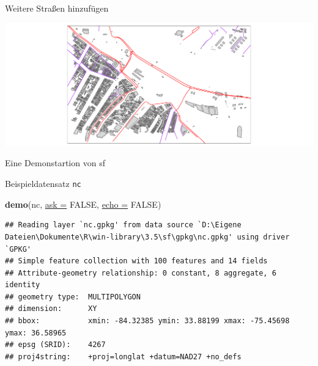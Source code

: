 \documentclass[ignorenonframetext,]{beamer}
\newenvironment{Shaded}{\begin{snugshade}}{\end{snugshade}}
\newcommand{\DataTypeTok}[1]{\textcolor[rgb]{0.74,0.68,0.62}{\underline{#1}}}
\newcommand{\KeywordTok}[1]{\textcolor[rgb]{0.26,0.66,0.93}{\textbf{#1}}}
\newcommand{\NormalTok}[1]{\textcolor[rgb]{0.74,0.68,0.62}{#1}}
\newcommand{\OperatorTok}[1]{\textcolor[rgb]{0.74,0.68,0.62}{#1}}
\newcommand{\OtherTok}[1]{\textcolor[rgb]{0.74,0.68,0.62}{#1}}
\newcommand{\StringTok}[1]{\textcolor[rgb]{0.02,0.61,0.04}{#1}}
\begin{document}
\begin{frame}[fragile]{Weitere Straßen hinzufügen}
\protect\hypertarget{weitere-straen-hinzufugen}{}

\begin{Shaded}
\end{Shaded}

\includegraphics{B7_simplefeatures_files/figure-beamer/unnamed-chunk-36-1.pdf}

\end{frame}

\begin{frame}[fragile]{Eine Demonstartion von sf}
\protect\hypertarget{eine-demonstartion-von-sf}{}

\begin{block}{Beispieldatensatz \texttt{nc}}

\begin{Shaded}
\begin{Highlighting}[]
\KeywordTok{demo}\NormalTok{(nc, }\DataTypeTok{ask =} \OtherTok{FALSE}\NormalTok{, }\DataTypeTok{echo =} \OtherTok{FALSE}\NormalTok{)}
\end{Highlighting}
\end{Shaded}

\begin{verbatim}
## Reading layer `nc.gpkg' from data source `D:\Eigene Dateien\Dokumente\R\win-library\3.5\sf\gpkg\nc.gpkg' using driver `GPKG'
## Simple feature collection with 100 features and 14 fields
## Attribute-geometry relationship: 0 constant, 8 aggregate, 6 identity
## geometry type:  MULTIPOLYGON
## dimension:      XY
## bbox:           xmin: -84.32385 ymin: 33.88199 xmax: -75.45698 ymax: 36.58965
## epsg (SRID):    4267
## proj4string:    +proj=longlat +datum=NAD27 +no_defs
\end{verbatim}

\end{block}

\end{frame}
\end{document}
